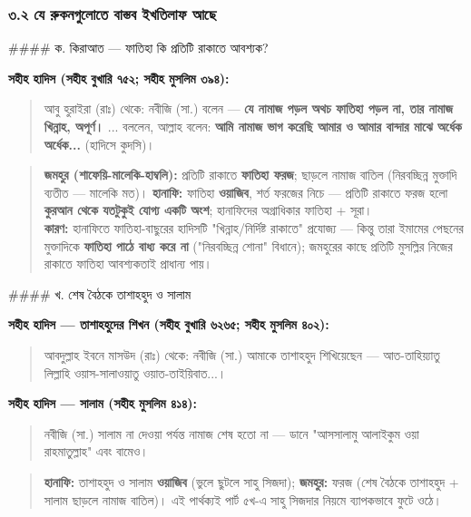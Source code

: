 \subsubsection*{৩.২ যে রুকনগুলোতে বাস্তব ইখতিলাফ আছে}

\#\#\#\# ক. কিরাআত — ফাতিহা কি প্রতিটি রাকাতে আবশ্যক?

\textbf{সহীহ হাদিস (সহীহ বুখারি ৭৫২; সহীহ মুসলিম ৩৯৪):}

\begin{quote}
আবু হুরাইরা (রাঃ) থেকে: নবীজি (সা.) বলেন — \textbf{যে নামাজ পড়ল অথচ ফাতিহা পড়ল না, তার নামাজ খিন্নাহ, অপূর্ণ।} ... বললেন, আল্লাহ বলেন: \textbf{আমি নামাজ ভাগ করেছি আমার ও আমার বান্দার মাঝে অর্ধেক অর্ধেক...} (হাদিসে কুদসি)।
\end{quote}

\begin{quote}
\textbf{জমহুর (শাফেয়ি-মালেকি-হাম্বলি):} প্রতিটি রাকাতে \textbf{ফাতিহা ফরজ}; ছাড়লে নামাজ বাতিল (নিরবচ্ছিন্ন মুক্তাদি ব্যতীত — মালেকি মত)। \textbf{হানাফি:} ফাতিহা \textbf{ওয়াজিব}, শর্ত ফরজের নিচে — প্রতিটি রাকাতে ফরজ হলো \textbf{কুরআন থেকে যতটুকুই যোগ্য একটি অংশ}; হানাফিদের অগ্রাধিকার ফাতিহা + সূরা। \\
\textbf{কারণ:} হানাফিতে ফাতিহা-বাছুরের হাদিসটি "খিন্নাহ/নির্দিষ্ট রাকাতে" প্রযোজ্য — কিন্তু তারা ইমামের পেছনের মুক্তাদিকে \textbf{ফাতিহা পাঠে বাধ্য করে না} ("নিরবচ্ছিন্ন শোনা" বিধানে); জমহুরের কাছে প্রতিটি মুসল্লির নিজের রাকাতে ফাতিহা আবশ্যকতাই প্রাধান্য পায়।
\end{quote}

\#\#\#\# খ. শেষ বৈঠকে তাশাহহুদ ও সালাম

\textbf{সহীহ হাদিস — তাশাহহুদের শিখন (সহীহ বুখারি ৬২৬৫; সহীহ মুসলিম ৪০২):}

\begin{quote}
আবদুল্লাহ ইবনে মাসউদ (রাঃ) থেকে: নবীজি (সা.) আমাকে তাশাহহুদ শিখিয়েছেন — আত-তাহিয়্যাতু লিল্লাহি ওয়াস-সালাওয়াতু ওয়াত-তাইয়িবাত...।
\end{quote}

\textbf{সহীহ হাদিস — সালাম (সহীহ মুসলিম ৪১৪):}

\begin{quote}
নবীজি (সা.) সালাম না দেওয়া পর্যন্ত নামাজ শেষ হতো না — ডানে "আসসালামু আলাইকুম ওয়া রাহমাতুল্লাহ" এবং বামেও।
\end{quote}

\begin{quote}
\textbf{হানাফি:} তাশাহহুদ ও সালাম \textbf{ওয়াজিব} (ভুলে ছুটলে সাহু সিজদা); \textbf{জমহুর:} ফরজ (শেষ বৈঠকে তাশাহহুদ + সালাম ছাড়লে নামাজ বাতিল)। এই পার্থক্যই পার্ট ৫খ-এ সাহু সিজদার নিয়মে ব্যাপকভাবে ফুটে ওঠে।
\end{quote}

